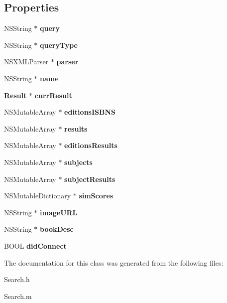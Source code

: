 \subsection*{Properties}
\begin{DoxyCompactItemize}
\item 
N\+S\+String $\ast$ {\bfseries query}\label{interface_search_aeb04e71a6ca5784a051a7cd63f4e2fc3}

\item 
N\+S\+String $\ast$ {\bfseries query\+Type}\label{interface_search_ac031fcc0b2ce56fb19cdd9694b8cdf2b}

\item 
N\+S\+X\+M\+L\+Parser $\ast$ {\bfseries parser}\label{interface_search_a8e7108974b7159d08459abf52e203827}

\item 
N\+S\+String $\ast$ {\bfseries name}\label{interface_search_ab368ed5b801db165369ebc66c8fafab6}

\item 
{\bf Result} $\ast$ {\bfseries curr\+Result}\label{interface_search_a4e82bb4f5a50ad85a1e2111b012f1a2d}

\item 
N\+S\+Mutable\+Array $\ast$ {\bfseries editions\+I\+S\+B\+N\+S}\label{interface_search_a07ba636aa360e7fb218bf734464861ef}

\item 
N\+S\+Mutable\+Array $\ast$ {\bfseries results}\label{interface_search_a0668886a14e92186615ff6bc00411271}

\item 
N\+S\+Mutable\+Array $\ast$ {\bfseries editions\+Results}\label{interface_search_a3e2691a3fe915d4c9ba857bb4d15263a}

\item 
N\+S\+Mutable\+Array $\ast$ {\bfseries subjects}\label{interface_search_a5b0dd445df4f4e86e71b15f53a609083}

\item 
N\+S\+Mutable\+Array $\ast$ {\bfseries subject\+Results}\label{interface_search_ad219c19b30b84d04cbbd8a5c78a13139}

\item 
N\+S\+Mutable\+Dictionary $\ast$ {\bfseries sim\+Scores}\label{interface_search_a7263d296cac4a23ef4ece7cbfd95aa35}

\item 
N\+S\+String $\ast$ {\bfseries image\+U\+R\+L}\label{interface_search_af1ea0a6d823560bf22ac7ecda4b45189}

\item 
N\+S\+String $\ast$ {\bfseries book\+Desc}\label{interface_search_a5b0aeea3349b499dd87950c5ef889003}

\item 
B\+O\+O\+L {\bfseries did\+Connect}\label{interface_search_a8d9005724e3ac7c89acb6aaf84ed1c0a}

\end{DoxyCompactItemize}


The documentation for this class was generated from the following files\+:\begin{DoxyCompactItemize}
\item 
Search.\+h\item 
Search.\+m\end{DoxyCompactItemize}
